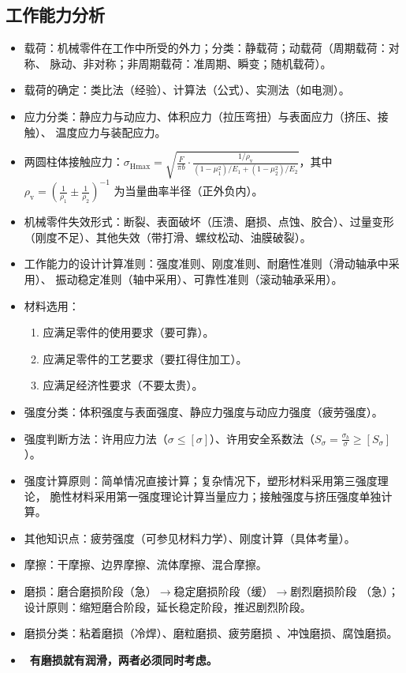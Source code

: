 \documentclass[12pt,a4paper]{article}
\newcommand{\tightlist}{\setlength{\parskip}{0pt}\setlength{\itemsep}{0pt}}
\newcommand{\hint}[1]{\textsf{（#1）}}
\newcommand{\minor}[1]{{\color{gray} #1}}
\newcommand{\then}{$\to$}
\renewcommand{\emph}[1]{\faIcon[regular]{lightbulb}\ \textbf{#1}}
\begin{document}
\subsection{工作能力分析}
\begin{itemize}\tightlist
    \item 载荷：机械零件在工作中所受的外力；分类：静载荷；动载荷\hint{周期载荷：对称、
    脉动、非对称；非周期载荷：准周期、瞬变；随机载荷}。
    \item \minor{载荷的确定：类比法\hint{经验}、计算法\hint{公式}、实测法\hint{如电测}。}
    \item 应力分类：静应力与动应力、体积应力\hint{拉压弯扭}与表面应力\hint{挤压、接触}、
    温度应力与装配应力。
    \item \minor{两圆柱体接触应力：$\sigma_\text{Hmax}=\sqrt{\frac F{\pi b}\cdot
    \frac{1/\rho_\text{v}}{(1-\mu_1^2)/E_1+(1-\mu_2^2)/E_2}}$，其中$\rho_\text{v}
    =\left(\frac1{\rho_1}\pm\frac1{\rho_2}\right)^{-1}$ 为当量曲率半径\hint{正外负内}。}
    \item 机械零件失效形式：断裂、表面破坏\hint{压溃、磨损、点蚀、胶合}、过量变形
    \hint{刚度不足}、其他失效\hint{带打滑、螺纹松动、油膜破裂}。
    \item 工作能力的设计计算准则：强度准则、刚度准则、耐磨性准则\hint{滑动轴承中采用}、
    振动稳定准则\hint{轴中采用}、可靠性准则\hint{滚动轴承采用}。
    \item 材料选用：
    \begin{enumerate}\tightlist
        \item 应满足零件的使用要求\hint{要可靠}。
        \item 应满足零件的工艺要求\hint{要扛得住加工}。
        \item 应满足经济性要求\hint{不要太贵}。
    \end{enumerate}
    \item 强度分类：体积强度与表面强度、静应力强度与动应力强度\hint{疲劳强度}。
    \item 强度判断方法：许用应力法\hint{$\sigma\leq[\sigma]$}、许用安全系数法\hint%
    {$S_\sigma=\frac{\sigma_b}{\sigma}\geq[S_\sigma]$}。
    \item \minor{强度计算原则：简单情况直接计算；复杂情况下，塑形材料采用第三强度理论，
    脆性材料采用第一强度理论计算当量应力；接触强度与挤压强度单独计算。}
    \item \minor{其他知识点：疲劳强度\hint{可参见材料力学}、刚度计算\hint{具体考量}。}
    \item \minor{摩擦：干摩擦、边界摩擦、流体摩擦、混合摩擦。}
    \item 磨损：磨合磨损阶段\hint{急}\then 稳定磨损阶段\hint{缓}\then 剧烈磨损阶段
    \hint{急}；设计原则：缩短磨合阶段，延长稳定阶段，推迟剧烈阶段。
    \item 磨损分类：粘着磨损\hint{冷焊}、磨粒磨损、疲劳磨损\minor{、冲蚀磨损、腐蚀磨损}。
    \item \emph{有磨损就有润滑，两者必须同时考虑。}
\end{itemize}
\end{document}
